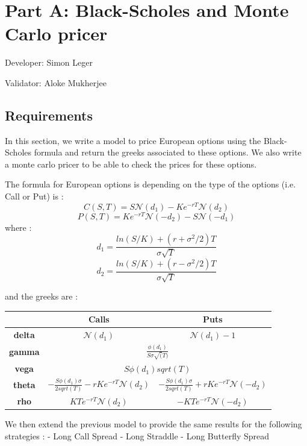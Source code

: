 \chapter{Part A: Black-Scholes and Monte Carlo pricer}
Developer: Simon Leger

\noindent Validator: Aloke Mukherjee



\section{Requirements}

In this section, we write a model to price European options using
the Black-Scholes formula and return the greeks associated to
these options. We also write a monte carlo pricer to be able to
check the prices for these options.

The formula for European options is depending on the type of the
options (i.e. Call or Put) is :
$$C(S,T)=S\mathcal{N}(d_1)-Ke^{-rT}\mathcal{N}(d_2)$$
$$P(S,T)=Ke^{-rT}\mathcal{N}(-d_2)-S\mathcal{N}(-d_1)$$
where :
$$d_1=\frac{ln(S/K)+(r+\sigma^2/2)T}{\sigma \sqrt{T}}$$
$$d_2=\frac{ln(S/K)+(r-\sigma^2/2)T}{\sigma \sqrt{T}}$$

and the greeks are :

\begin{center}
\begin{tabular}{|c|c|c|}
\hline
    {\bf } & {\bf Calls} & {\bf Puts} \\
\hline
{\bf delta} &     {$\mathcal{N}(d_1)$} &     {$\mathcal{N}(d_1)-1$} \\
\hline
{\bf gamma} & \multicolumn{ 2}{|c|}{{$\frac{\phi(d_1)}{S\sigma \sqrt(T)}$}} \\
\hline
{\bf vega} & \multicolumn{ 2}{|c|}{${S\phi(d_1)sqrt(T)}$} \\
\hline
{\bf theta} &     {$-\frac{S\phi(d_1)\sigma}{2sqrt(T)}-rKe^{-rT}\mathcal{N}(d_2) $} &     {$-\frac{S\phi(d_1)\sigma}{2sqrt(T)}+rKe^{-rT}\mathcal{N}(-d_2)  $} \\
\hline
 {\bf rho} &     {$KTe^{-rT}\mathcal{N}(d_2)$} &     {$-KTe^{-rT}\mathcal{N}(-d_2)$} \\
\hline
\end{tabular}
\end{center}

We then extend the previous model to provide the same results for
the following strategies :
    - Long Call Spread
    - Long Straddle
    - Long Butterfly Spread

